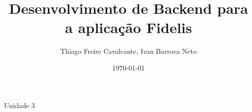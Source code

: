 \documentclass[a4paper,12pt]{article}
\title{Desenvolvimento de Backend para a aplicação Fidelis}
\author{Thiago Freire Cavalcante, Ivan Barroca Neto}
\date{\today}
\begin{document}
\maketitle

\noindent   Unidade 3

\newpage

\tableofcontents


\end{document}
